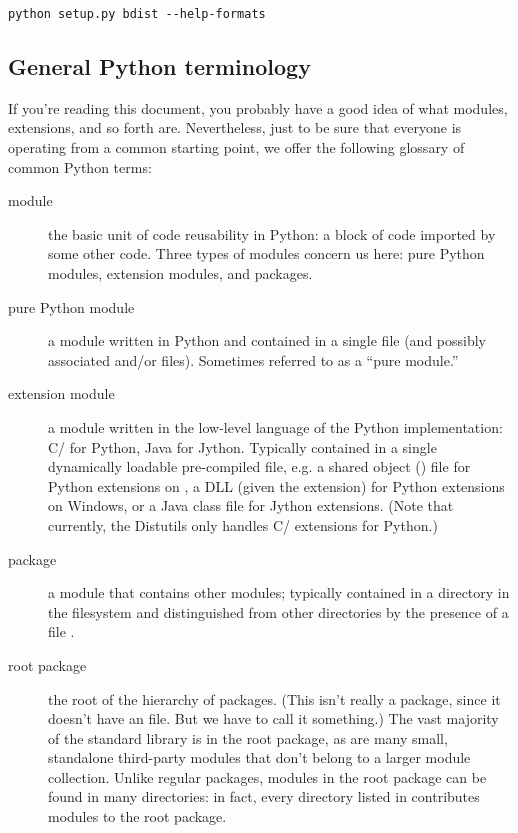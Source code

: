 \documentclass{howto}
\begin{document}
\begin{verbatim}
python setup.py bdist --help-formats
\end{verbatim}


\subsection{General Python terminology}
\label{python-terms}

If you're reading this document, you probably have a good idea of what
modules, extensions, and so forth are.  Nevertheless, just to be sure
that everyone is operating from a common starting point, we offer the
following glossary of common Python terms:
\begin{description}
\item[module] the basic unit of code reusability in Python: a block of
  code imported by some other code.  Three types of modules concern us
  here: pure Python modules, extension modules, and packages.

\item[pure Python module] a module written in Python and contained in a
  single  file (and possibly associated  and/or
   files).  Sometimes referred to as a ``pure module.''

\item[extension module] a module written in the low-level language of
  the Python implementation: C/\Cpp{} for Python, Java for Jython.
  Typically contained in a single dynamically loadable pre-compiled
  file, e.g. a shared object () file for Python extensions on
  \UNIX, a DLL (given the  extension) for Python extensions
  on Windows, or a Java class file for Jython extensions.  (Note that
  currently, the Distutils only handles C/\Cpp{} extensions for Python.)

\item[package] a module that contains other modules; typically contained
  in a directory in the filesystem and distinguished from other
  directories by the presence of a file .

\item[root package] the root of the hierarchy of packages.  (This isn't
  really a package, since it doesn't have an 
  file.  But we have to call it something.)  The vast majority of the
  standard library is in the root package, as are many small, standalone
  third-party modules that don't belong to a larger module collection.
  Unlike regular packages, modules in the root package can be found in
  many directories: in fact, every directory listed in 
  contributes modules to the root package.
\end{description}
\end{document}
